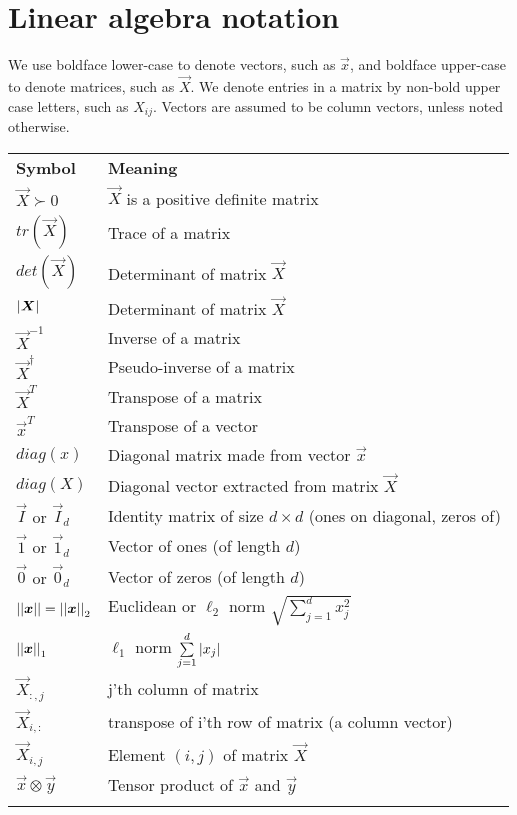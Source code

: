 \section*{Linear algebra notation}
We use boldface lower-case to denote vectors, such as $\vec{x}$, and boldface upper-case to denote matrices, such as $\vec{X}$. We denote entries in a matrix by non-bold upper case letters, such as $X_{ij}$. Vectors are assumed to be column vectors, unless noted otherwise.

\begin{longtable}{ll}
\hline\noalign{\smallskip}
\textbf{Symbol} & \textbf{Meaning} \\
\noalign{\smallskip}\hline\noalign{\smallskip}
$\vec{X} \succ 0$ & $\vec{X}$ is a positive definite matrix\\
$tr(\vec{X})$ & Trace of a matrix\\
$det(\vec{X})$ & Determinant of matrix $\vec{X}$\\
$\abs{\vec{X}}$ & Determinant of matrix $\vec{X}$\\
$\vec{X}^{-1}$ & Inverse of a matrix\\
$\vec{X}^{\dagger}$ & Pseudo-inverse of a matrix\\
$\vec{X}^T$ & Transpose of a matrix\\
$\vec{x}^T$ & Transpose of a vector\\
$diag(x)$ & Diagonal matrix made from vector $\vec{x}$\\
$diag(X)$ & Diagonal vector extracted from matrix $\vec{X}$\\
$\vec{I}$ or $\vec{I}_d$ & Identity matrix of size $d \times d$ (ones on diagonal, zeros of)\\
$\vec{1}$ or $\vec{1}_d$ & Vector of ones (of length $d$)\\
$\vec{0}$ or $\vec{0}_d$ & Vector of zeros (of length $d$)\\
$\abs{\abs{\vec{x}}}=\abs{\abs{\vec{x}}}_2$ & Euclidean or $\ell_2$ norm $\sqrt{\sum\limits_{j=1}^{d} x_j^2}$\\
$\abs{\abs{\vec{x}}}_1$ & $\ell_1$ norm $\sum\limits_{j=1}^{d} \left\lvert x_j\right\rvert$\\
$\vec{X}_{:,j}$ & j’th column of matrix\\
$\vec{X}_{i,:}$ & transpose of i’th row of matrix (a column vector)\\
$\vec{X}_{i,j}$ & Element $(i,j)$ of matrix $\vec{X}$ \\
$\vec{x} \otimes \vec{y}$ & Tensor product of $\vec{x}$ and $\vec{y}$\\
\noalign{\smallskip}\hline\noalign{\smallskip}
\end{longtable}



